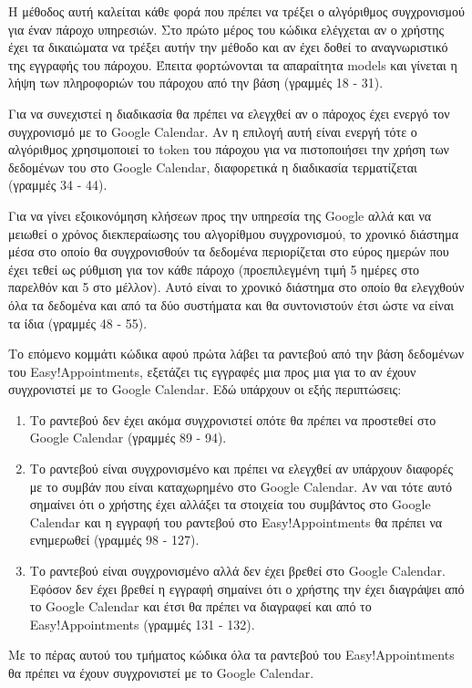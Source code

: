 

Η μέθοδος αυτή καλείται κάθε φορά που πρέπει να τρέξει ο αλγόριθμος συγχρονισμού για έναν πάροχο υπηρεσιών. Στο πρώτο μέρος του κώδικα ελέγχεται αν ο χρήστης έχει τα δικαιώματα να τρέξει αυτήν την μέθοδο και αν έχει δοθεί το αναγνωριστικό της εγγραφής του πάροχου. Έπειτα φορτώνονται τα απαραίτητα models και γίνεται η λήψη των πληροφοριών του πάροχου από την βάση (γραμμές 18 - 31). 

Για να συνεχιστεί η διαδικασία θα πρέπει να ελεγχθεί αν ο πάροχος έχει ενεργό τον συγχρονισμό με το Google Calendar. Αν η επιλογή αυτή είναι ενεργή τότε ο αλγόριθμος χρησιμοποιεί το token του πάροχου για να πιστοποιήσει την χρήση των δεδομένων του στο Google Calendar, διαφορετικά η διαδικασία τερματίζεται (γραμμές 34 - 44). 

Για να γίνει εξοικονόμηση κλήσεων προς την υπηρεσία της Google αλλά και να μειωθεί ο χρόνος διεκπεραίωσης του αλγορίθμου συγχρονισμού, το χρονικό διάστημα μέσα στο οποίο θα συγχρονισθούν τα δεδομένα περιορίζεται στο εύρος ημερών που έχει τεθεί ως ρύθμιση για τον κάθε πάροχο (προεπιλεγμένη τιμή 5 ημέρες στο παρελθόν και 5 στο μέλλον). Αυτό είναι το χρονικό διάστημα στο οποίο θα ελεγχθούν όλα τα δεδομένα και από τα δύο συστήματα και θα συντονιστούν έτσι ώστε να είναι τα ίδια (γραμμές 48 - 55).

Το επόμενο κομμάτι κώδικα αφού πρώτα λάβει τα ραντεβού από την βάση δεδομένων του Easy!Appointments, εξετάζει τις εγγραφές μια προς μια για το αν έχουν συγχρονιστεί με το Google Calendar. Εδώ υπάρχουν οι εξής περιπτώσεις:
\begin{enumerate}
\item Το ραντεβού δεν έχει ακόμα συγχρονιστεί οπότε θα πρέπει να προστεθεί στο Google Calendar (γραμμές 89 - 94).
\item Το ραντεβού είναι συγχρονισμένο και πρέπει να ελεγχθεί αν υπάρχουν διαφορές με το συμβάν που είναι καταχωρημένο στο Google Calendar. Αν ναι τότε αυτό σημαίνει ότι ο χρήστης έχει αλλάξει τα στοιχεία του συμβάντος στο Google Calendar και η εγγραφή του ραντεβού στο Easy!Appointments θα πρέπει να ενημερωθεί (γραμμές 98 - 127).
\item Το ραντεβού είναι συγχρονισμένο αλλά δεν έχει βρεθεί στο Google Calendar. Εφόσον δεν έχει βρεθεί η εγγραφή σημαίνει ότι ο χρήστης την έχει διαγράψει από το Google Calendar και έτσι θα πρέπει να διαγραφεί και από το Easy!Appointments (γραμμές 131 - 132).
\end{enumerate}
Με το πέρας αυτού του τμήματος κώδικα όλα τα ραντεβού του Easy!Appointments θα πρέπει να έχουν συγχρονιστεί με το Google Calendar.


